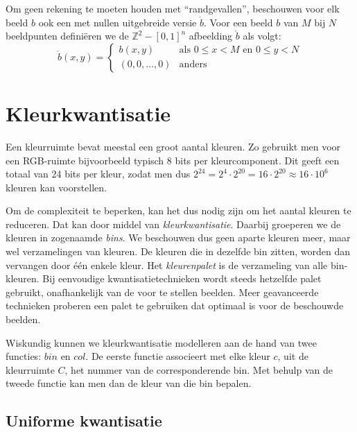 Om geen rekening te moeten houden met ``randgevallen'', beschouwen voor elk beeld $b$ ook een
met nullen uitgebreide versie $\mathring{b}$. Voor een beeld $b$ van $M$ bij $N$ beeldpunten
defini\"eren we de $\mathbb{Z}^2 - [0,1]^n$ afbeelding $\mathring{b}$ als volgt:
\begin{displaymath}
\mathring{b}(x,y) = \begin{cases}
b(x,y) & \textrm{als } 0 \le x < M \textrm{ en } 0 \le y < N \\
(0,0,\ldots,0) & \textrm{anders}
\end{cases}
\end{displaymath}

\section{Kleurkwantisatie}
\label{sectie:kleurkwantisatie}

Een kleurruimte bevat meestal een groot aantal 
kleuren. Zo gebruikt men voor een RGB-ruimte bijvoorbeeld typisch 8 bits per 
kleurcomponent. Dit geeft een totaal van 24 bits per kleur, zodat men dus 
$2^{24}=2^4 \cdot 2^{20}=16 \cdot 2^{20} \approx 16 \cdot 10^6$ kleuren kan 
voorstellen.

Om de complexiteit te beperken, kan het dus nodig zijn om het aantal kleuren te 
reduceren. Dat kan door middel van \emph{kleurkwantisatie}. Daarbij groeperen we de kleuren in 
zogenaamde \emph{bins}. We beschouwen dus geen aparte kleuren meer, maar wel 
verzamelingen van kleuren. De kleuren die in dezelfde bin zitten, worden dan 
vervangen door \'e\'en enkele kleur. Het \emph{kleurenpalet} is de verzameling 
van alle bin-kleuren. Bij eenvoudige kwantisatietechnieken wordt steeds 
hetzelfde palet gebruikt, onafhankelijk van de voor te stellen beelden. Meer 
geavanceerde technieken proberen een palet te gebruiken dat optimaal is voor de 
beschouwde beelden.

Wiskundig kunnen we kleurkwantisatie modelleren aan de hand van twee functies: 
$bin$ en $col$. De eerste functie associeert met elke kleur $c$, uit de 
kleurruimte $C$, het nummer van de corresponderende bin. Met behulp van de 
tweede functie kan men dan de kleur van die bin bepalen.

\subsection{Uniforme kwantisatie}


